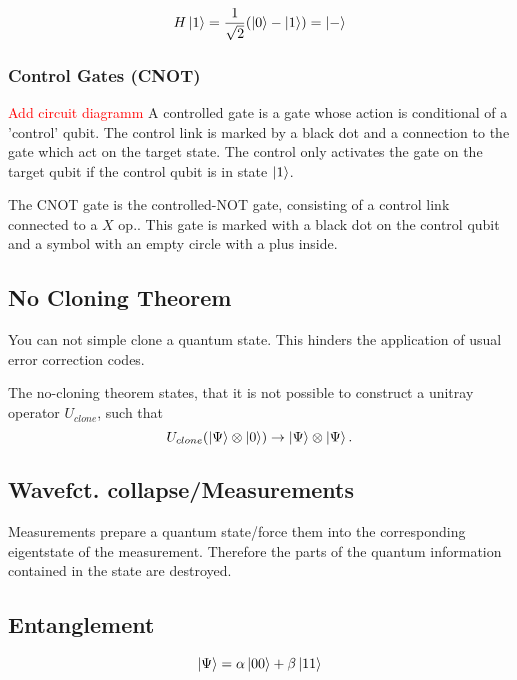 \begin{equation}
    H\ket{1} = \frac{1}{\sqrt{2}} (\ket{0} - \ket{1}) = \ket{-}
\end{equation}
\cite{QECintro}


\subsubsection{Control Gates (CNOT)}\label{sec:basic.math.gates.cnot}
\textcolor{red}{Add circuit diagramm}
A controlled gate is a gate whose action is conditional of a 'control' qubit.
The control link is marked by a black dot and a connection to the gate which act on the target state. 
The control only activates the gate on the target qubit if the control qubit is in state $\ket{1}$.

The CNOT gate is the controlled-NOT gate, consisting of a control link connected to a $X$ op.. 
This gate is marked with a black dot on the control qubit and a symbol with an empty circle with a plus inside.


\subsection{No Cloning Theorem}\label{sec:basic.math.no_cloning_theorem}
You can not simple clone a quantum state. 
This hinders the application of usual error correction codes.

The no-cloning theorem states, that it is not possible to construct a unitray operator $U_{clone}$, such that 
\begin{equation}
    U_{clone} (\ket{\Psi} \otimes \ket{0} ) \rightarrow \ket{\Psi} \otimes \ket{\Psi}.
\end{equation}
\cite{QECintro}


\subsection{Wavefct. collapse/Measurements}\label{sec:basic.math.wavefct_collpase}
Measurements prepare a quantum state/force them into the corresponding eigentstate of the measurement.
Therefore the parts of the quantum information contained in the state are destroyed.


\subsection{Entanglement}
\begin{equation}
    \ket{\Psi} = \alpha \ket{00} + \beta \ket{11}
\end{equation}


